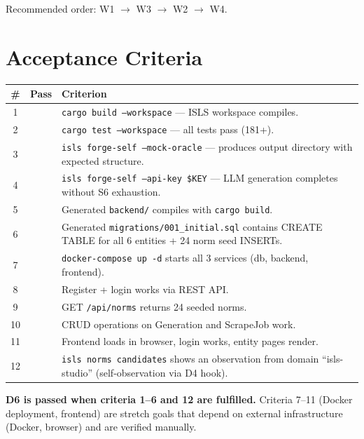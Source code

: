 \documentclass[11pt,a4paper]{article}
\begin{document}
Recommended order: W1 $\to$ W3 $\to$ W2 $\to$ W4.


\section{Acceptance Criteria}
\label{sec:acceptance}

\begin{longtable}{clp{9cm}}
\toprule
\textbf{\#} & \textbf{Pass} & \textbf{Criterion} \\
\midrule
1 & & \texttt{cargo build --workspace} --- ISLS workspace compiles. \\
2 & & \texttt{cargo test --workspace} --- all tests pass (181+). \\
3 & & \texttt{isls forge-self --mock-oracle} --- produces output
      directory with expected structure. \\
4 & & \texttt{isls forge-self --api-key \$KEY} --- LLM generation
      completes without S6 exhaustion. \\
5 & & Generated \texttt{backend/} compiles with \texttt{cargo build}. \\
6 & & Generated \texttt{migrations/001\_initial.sql} contains
      CREATE TABLE for all 6 entities + 24 norm seed INSERTs. \\
7 & & \texttt{docker-compose up -d} starts all 3 services
      (db, backend, frontend). \\
8 & & Register + login works via REST API. \\
9 & & GET \texttt{/api/norms} returns 24 seeded norms. \\
10 & & CRUD operations on Generation and ScrapeJob work. \\
11 & & Frontend loads in browser, login works, entity pages
       render. \\
12 & & \texttt{isls norms candidates} shows an observation from
       domain ``isls-studio'' (self-observation via D4 hook). \\
\bottomrule
\end{longtable}

\textbf{D6 is passed when criteria 1--6 and 12 are fulfilled.}
Criteria 7--11 (Docker deployment, frontend) are stretch goals
that depend on external infrastructure (Docker, browser) and are
verified manually.


\end{document}
